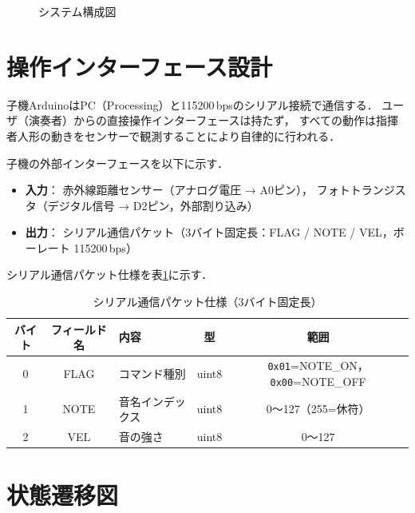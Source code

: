 \begin{figure}[H]
  \centering
  \caption{システム構成図}
  \label{fig:sysconfig}
\end{figure}

\section{操作インターフェース設計}

子機ArduinoはPC（Processing）と115200\,bpsのシリアル接続で通信する．
ユーザ（演奏者）からの直接操作インターフェースは持たず，
すべての動作は指揮者人形の動きをセンサーで観測することにより自律的に行われる．

子機の外部インターフェースを以下に示す．
\begin{itemize}
  \item \textbf{入力}：
    赤外線距離センサー（アナログ電圧 → A0ピン），
    フォトトランジスタ（デジタル信号 → D2ピン，外部割り込み）
  \item \textbf{出力}：
    シリアル通信パケット（3バイト固定長：FLAG / NOTE / VEL，ボーレート 115200\,bps）
\end{itemize}

シリアル通信パケット仕様を表\ref{tab:packet}に示す．

\begin{table}[H]
  \centering
  \begin{tabular}{cclcc}
    \toprule
    バイト & フィールド名 & 内容 & 型 & 範囲 \\
    \midrule
    0 & FLAG & コマンド種別 & uint8 &
      \texttt{0x01}=NOTE\_ON，\texttt{0x00}=NOTE\_OFF \\
    1 & NOTE & 音名インデックス & uint8 & 0〜127（255=休符） \\
    2 & VEL  & 音の強さ & uint8 & 0〜127 \\
    \bottomrule
  \end{tabular}
  \caption{シリアル通信パケット仕様（3バイト固定長）}
  \label{tab:packet}
\end{table}

\section{状態遷移図}

